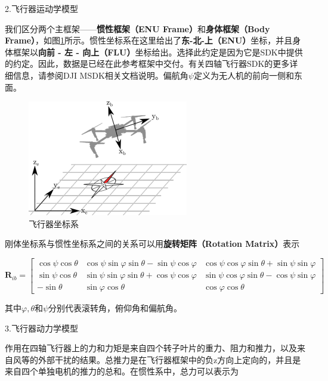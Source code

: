 2.飞行器运动学模型

我们区分两个主框架——\textbf{惯性框架（ENU Frame）}和\textbf{身体框架（Body Frame）}，如图\ref{Fig:img-append10}所示。惯性坐标系在这里给出了\textbf{东-北-上（ENU）}坐标，并且身体框架以\textbf{向前 - 左 - 向上（FLU）}坐标给出\cite{ArtE13}。选择此约定是因为它是SDK中提供的约定。因此，数据是已经在此参考框架中交付。有关四轴飞行器SDK的更多详细信息，请参阅DJI MSDK相关文档说明。偏航角$\psi$定义为无人机的前向一侧和东面。

\begin{figure}[ht]
  \centering
  \includegraphics[width=0.8\linewidth]{./Figure/Drone_Coordinate_System.png}
  \caption{飞行器坐标系}\label{Fig:img-append10}
\end{figure}

刚体坐标系与惯性坐标系之间的关系可以用\textbf{旋转矩阵（Rotation Matrix）}表示

\begin{equation}
\boldsymbol{R}_{i b}=\left[\begin{array}{ccc}
\cos \psi \cos \theta & \cos \psi \sin \varphi \sin \theta-\sin \psi \cos \varphi & \cos \psi \cos \varphi \sin \theta+\sin \psi \sin \varphi \\
\sin \psi \cos \theta & \sin \psi \sin \varphi \sin \theta+\cos \psi \cos \varphi & \sin \psi \cos \varphi \sin \theta-\cos \psi \sin \varphi \\
-\sin \theta & \sin \varphi \cos \theta & \cos \varphi \cos \theta
\end{array}\right]
\end{equation}

其中$\varphi, \theta$和$\psi$分别代表滚转角，俯仰角和偏航角。

3.飞行器动力学模型

作用在四轴飞行器上的力和力矩是来自四个转子叶片的重力、阻力和推力，以及来自风等的外部干扰的结果。总推力是在飞行器框架中的负z方向上定向的，并且是来自四个单独电机的推力的总和\cite{ArtE13}。在惯性系中，总力可以表示为

